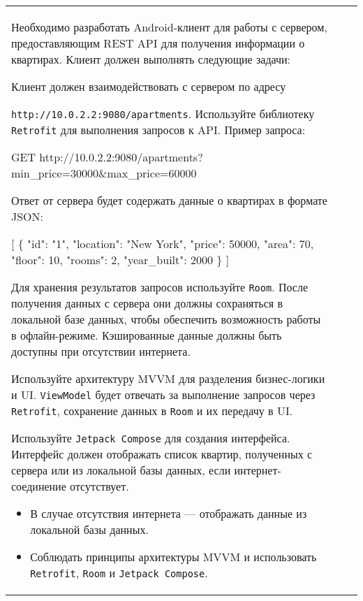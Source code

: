 \documentclass[a4paper]{article}
\begin{document}
\begin{tabular}{!{\vrule width 2pt}p{5cm}|p{6cm}|p{4cm}!{\vrule width 2pt}}
{\begin{minipage}{16cm}
\begin{enumerate}
Необходимо разработать Android-клиент для работы с сервером, предоставляющим REST API для получения информации о квартирах. Клиент должен выполнять следующие задачи:

Клиент должен взаимодействовать с сервером по адресу 

\texttt{http://10.0.2.2:9080/apartments}. Используйте библиотеку \texttt{Retrofit} для выполнения запросов к API. Пример запроса:


GET http://10.0.2.2:9080/apartments?min\_price=30000\&max\_price=60000


Ответ от сервера будет содержать данные о квартирах в формате JSON:


[
  \{
    "id": "1",
    "location": "New York",
    "price": 50000,
    "area": 70,
    "floor": 10,
    "rooms": 2,
    "year\_built": 2000
  \}
]


Для хранения результатов запросов используйте \texttt{Room}. После получения данных с сервера они должны сохраняться в локальной базе данных, чтобы обеспечить возможность работы в офлайн-режиме. Кэшированные данные должны быть доступны при отсутствии интернета.

Используйте архитектуру MVVM для разделения бизнес-логики и UI. \texttt{ViewModel} будет отвечать за выполнение запросов через \texttt{Retrofit}, сохранение данных в \texttt{Room} и их передачу в UI.

Используйте \texttt{Jetpack Compose} для создания интерфейса. Интерфейс должен отображать список квартир, полученных с сервера или из локальной базы данных, если интернет-соединение отсутствует.

\begin{itemize}
  \item В случае отсутствия интернета — отображать данные из локальной базы данных.
  \item Соблюдать принципы архитектуры MVVM и использовать \texttt{Retrofit}, \texttt{Room} и \texttt{Jetpack Compose}.
\end{itemize} 
\end{enumerate}


\end{minipage}}
\end{tabular}
\end{document}
